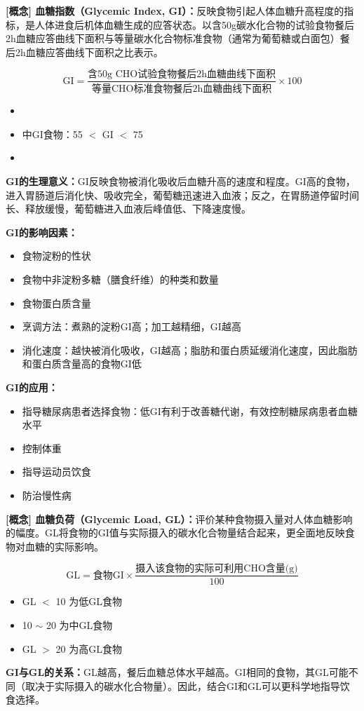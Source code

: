 \begin{keybox}
\textbf{[概念] 血糖指数（Glycemic Index, GI）\difficulty：}反映食物引起人体血糖升高程度的指标，是人体进食后机体血糖生成的应答状态。以含50g碳水化合物的试验食物餐后2h血糖应答曲线下面积与等量碳水化合物标准食物（通常为葡萄糖或白面包）餐后2h血糖应答曲线下面积之比表示。

\[\text{GI} = \frac{\text{含50g CHO试验食物餐后2h血糖曲线下面积}}{\text{等量CHO标准食物餐后2h血糖曲线下面积}} \times 100\]

\begin{itemize}[leftmargin=*]
    \item {}
    \item 中GI食物：55 $<$ GI $<$ 75
    \item {}
\end{itemize}

\textbf{GI的生理意义：}GI反映食物被消化吸收后血糖升高的速度和程度。GI高的食物，进入胃肠道后消化快、吸收完全，葡萄糖迅速进入血液；反之，在胃肠道停留时间长、释放缓慢，葡萄糖进入血液后峰值低、下降速度慢。

\textbf{GI的影响因素：}
\begin{itemize}[leftmargin=*]
    \item 食物淀粉的性状
    \item 食物中非淀粉多糖（膳食纤维）的种类和数量
    \item 食物蛋白质含量
    \item 烹调方法：煮熟的淀粉GI高；加工越精细，GI越高
    \item 消化速度：越快被消化吸收，GI越高；脂肪和蛋白质延缓消化速度，因此脂肪和蛋白质含量高的食物GI低
\end{itemize}

\textbf{GI的应用：}
\begin{itemize}[leftmargin=*]
    \item 指导糖尿病患者选择食物：低GI有利于改善糖代谢，有效控制糖尿病患者血糖水平
    \item 控制体重
    \item 指导运动员饮食
    \item 防治慢性病
\end{itemize}

\textbf{[概念] 血糖负荷（Glycemic Load, GL）：}评价某种食物摄入量对人体血糖影响的幅度。GL将食物的GI值与实际摄入的碳水化合物量结合起来，更全面地反映食物对血糖的实际影响。

\[\text{GL} = \text{食物GI} \times \frac{\text{摄入该食物的实际可利用CHO含量(g)}}{100}\]

\begin{itemize}[leftmargin=*]
    \item GL $<$ 10 为低GL食物
    \item 10 $\sim$ 20 为中GL食物
    \item GL $>$ 20 为高GL食物
\end{itemize}

\textbf{GI与GL的关系：}GL越高，餐后血糖总体水平越高。GI相同的食物，其GL可能不同（取决于实际摄入的碳水化合物量）。因此，结合GI和GL可以更科学地指导饮食选择。
\end{keybox}

